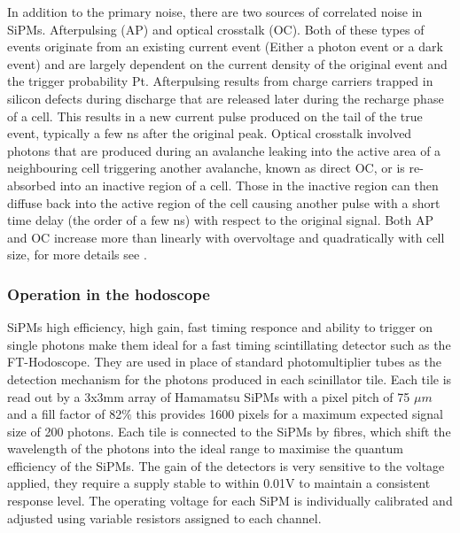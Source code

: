 In addition to the primary noise, there are two sources of correlated noise in SiPMs. Afterpulsing (AP) and optical crosstalk (OC). Both of these types of events originate from an existing current event (Either a photon event or a dark event) and are largely dependent on the current density of the original event and the trigger probability Pt. Afterpulsing results from charge carriers trapped in silicon defects during discharge that are released later during the recharge phase of a cell. This results in a new current pulse produced on the tail of the true event, typically a few ns after the original peak. Optical crosstalk involved photons that are produced during an avalanche leaking into the active area of a neighbouring cell triggering another avalanche, known as direct OC, or is re-absorbed into an inactive region of a cell. Those in the inactive region can then diffuse back into the active region of the cell causing another pulse with a short time delay (the order of a few ns) with respect to the original signal. Both AP and OC increase more than linearly with overvoltage and quadratically with cell size, for more details see \cite{gola2012sipm}.


\subsubsection*{Operation in the hodoscope}

SiPMs high efficiency, high gain, fast timing responce and ability to trigger on single photons make them ideal for a fast timing scintillating detector such as the FT-Hodoscope. They are used in place of standard photomultiplier tubes as the detection mechanism for the photons produced in each scinillator tile. Each tile is read out by a 3x3mm array of Hamamatsu SiPMs with a pixel pitch of 75 $\mu m$ and a fill factor of 82$\%$ this provides 1600 pixels for a maximum expected signal size of 200 photons. Each tile is connected to the SiPMs by fibres, which shift the wavelength of the photons into the ideal range to maximise the quantum efficiency of the SiPMs. The gain of the detectors is very sensitive to the voltage applied, they require a supply stable to within 0.01V to maintain a consistent response level. The operating voltage for each SiPM is individually calibrated and adjusted using variable resistors assigned to each channel. 

